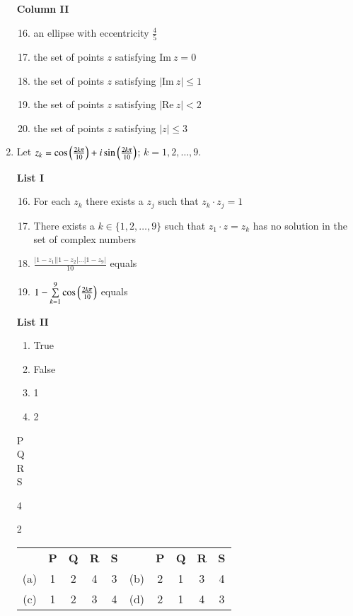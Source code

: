 \documentclass[journal,12pt,twocolumn]{IEEEtran}
\theoremstyle{remark}
\newcommand{\RE}{\mathrm{Re}}
\newcommand{\IM}{\mathrm{Im}}
\begin{document}
\begin{enumerate}[label=\arabic*)]
		\textbf{Column II}
		\begin{enumerate}[label=(\alph*)]
				\setcounter{enumii}{15}
			\item an ellipse with eccentricity $\frac 4 5$
			\item the set of points $z$ satisfying $\IM\ z = 0$
			\item the set of points $z$ satisfying $|\IM\ z| \le 1$
			\item the set of points $z$ satisfying $|\RE\ z| < 2$
			\item the set of points $z$ satisfying $|z| \le 3$
		\end{enumerate}

	\item Let $z_k = \cos\left(\frac {2k\pi} {10}\right) + i\sin\left(\frac {2k\pi} {10}\right)$; $k = 1,2,\dots,9$.
		\hfill {}

		\textbf{List I}
		\begin{enumerate}[label=\Alph*.]
				\setcounter{enumii}{15}
			\item For each $z_k$ there exists a $z_j$ such that $z_k \cdot z_j = 1$
			\item There exists a $k \in \{1,2,\dots, 9\}$ such that $z_1 \cdot z = z_k$ has no 
				solution in the set of complex numbers
			\item $\frac {|1 - z_1||1 - z_2|\dots|1-z_9|} {10}$ equals
			\item $1 - \sum\limits_{k=1}^9 \cos \left(\frac {2k\pi} {10}\right)$ equals
		\end{enumerate}

		\textbf{List II}
		\begin{enumerate}[label=\arabic*.]
			\item True
			\item False
			\item 1
			\item 2
		\end{enumerate}

		\begin{multicols}{2}
			\begin{multicols}{4}
				P \\
				Q \\
				R \\
				S \\
			\end{multicols}{4}
		\end{multicols}{2}			

		\begin{tabular}{c c c c c c c c c c}
			& \textbf P & \textbf Q & \textbf R & \textbf S & & \textbf P & \textbf Q & \textbf R & \textbf S \\
			(a) & 1 & 2 & 4 & 3 & (b) & 2 & 1 & 3 & 4 \\
			(c) & 1 & 2 & 3 & 4 & (d) & 2 & 1 & 4 & 3 \\
		\end{tabular}
\end{enumerate}
\end{document}
